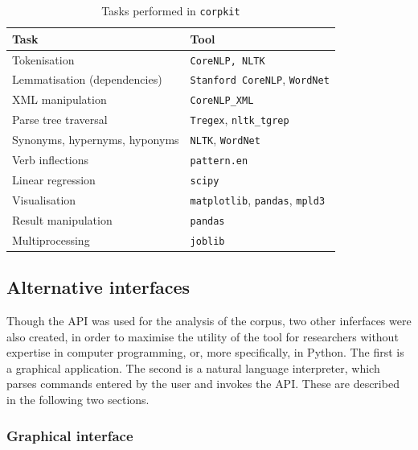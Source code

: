 \begin{table}[htb]
\centering
\small
\begin{tabular}{ll}

\toprule
Task                         & Tool  \\ 
\midrule
Tokenisation                 & \texttt{CoreNLP, NLTK} \\     
Lemmatisation (dependencies) & \texttt{Stanford CoreNLP}, \texttt{WordNet} \\
\gls{XML} manipulation             & \texttt{CoreNLP\_XML}  \\ 
Parse tree traversal         & \texttt{Tregex}, \texttt{nltk\_tgrep}  \\ 
Synonyms, hypernyms, hyponyms & \texttt{NLTK}, \texttt{WordNet}  \\ 
Verb inflections             & \texttt{pattern.en}  \\ 
Linear regression   & \texttt{scipy}          \\ 
Visualisation                & \texttt{matplotlib}, \texttt{pandas}, \texttt{mpld3}  \\ 
Result manipulation          & \texttt{pandas}    \\ 
Multiprocessing              & \texttt{joblib}  \\ 
\bottomrule
\end{tabular}
\caption{Tasks performed in \texttt{corpkit}}

\label{tab:corpkit:deps}
\end{table} 

\subsection{Alternative interfaces}

Though the \gls{API} was used for the analysis of the  \Gls{corpus}, two other inferfaces were also created, in order to maximise the utility of the tool for researchers without expertise in computer programming, or, more specifically, in Python. The first is a graphical application. The second is a natural language interpreter, which parses commands entered by the user and invokes the \gls{API}. These are described in the following two sections.

\subsubsection{Graphical interface}

